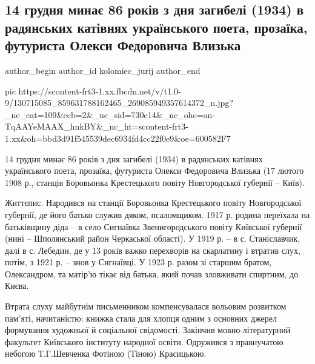  
 
 
 
 
 
\subsection{14 грудня минає 86 років з дня загибелі (1934) в радянських катівнях українського поета, прозаїка, футуриста Олекси Федоровича Влизька}
\label{sec:13_12_2020.fb.kolomiec_jurij.1.oleksa_vlyzko}
\ifcmt
	author_begin
   author_id kolomiec_jurij
	author_end
\fi

\ifcmt
pic https://scontent-frt3-1.xx.fbcdn.net/v/t1.0-9/130715085_859631788162465_269085949357614372_n.jpg?_nc_cat=109&ccb=2&_nc_sid=730e14&_nc_ohc=an-TqAAYeMAAX_hnkBY&_nc_ht=scontent-frt3-1.xx&oh=bbd3d91f545539dec6934fd4cc22f0e9&oe=600582F7
\fi

14 грудня минає 86 років з дня загибелі (1934) в радянських катівнях
українського поета, прозаїка, футуриста Олекси Федоровича Влизька (17 лютого
1908 р., станція Боровьонка Крестецького повіту Новгородської губернії – Київ).

Життєпис. Народився на станції Боровьонка Крестецького повіту Новгородської
губернії, де його батько служив дяком, псаломщиком. 1917 р. родина переїхала на
батьківщину діда – в село Сигнаївка Звенигородського повіту Київської губернії
(нині – Шполянський район Черкаської області). У 1919 р. – в с. Станіславчик,
далі в с. Лебедин, де у 13 років важко перехворів на скарлатину і втратив слух,
потім, з 1921 р. – знов у Сигнаївці. У 1923 р. разом зі старшим братом,
Олександром, та матір'ю тікає від батька, який почав зловживати спиртним, до
Києва.

Втрата слуху майбутнім письменником компенсувалася вольовим розвитком пам'яті,
начитаністю: книжка стала для хлопця одним з основних джерел формування
художньої й соціальної свідомості. Закінчив мовно-літературний факультет
Київського інституту народної освіти. Одружився з правнучатою небогою
Т.Г.Шевченка Фотіною (Тіною) Красицькою.

